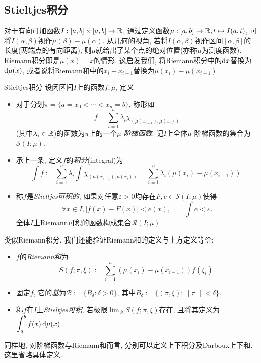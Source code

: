 \subsection{Stieltjes积分}

对于有向可加函数$I:[a,b] \times [a,b] \to \mathbb{R}$, 通过定义函数$\mu :[a,b] \to \mathbb{R} ,t \mapsto I(a,t)$, 可将$I(\alpha ,\beta)$视作$\mu (\beta)-\mu (\alpha)$. 从几何的视角, 若将$I(\alpha ,\beta)$视作区间$[\alpha ,\beta ]$的长度(两端点的有向距离), 则$\mu$就给出了某个点的绝对位置(亦称$\mu$为测度函数). Riemann积分即是$\mu (x)=x$的情形. 这启发我们, 将Riemann积分中的$\mathop{}\!\mathrm{d} x$替换为$\mathop{}\!\mathrm{d} \mu (x)$, 或者说将Riemann和中的$x_i-x_{i-1}$替换为$\mu (x_i)- \mu (x_{i-1})$. 

\begin{definition}{Stieltjes积分}
	设闭区间$I$上的函数$f,\mu$, 定义
	\begin{itemize}
		\item 对于分划$\pi = \{ a=x_0<\cdots <x_n=b \}$, 称形如$$f = \sum_{i=1}^{n} \lambda _i \chi _{(\mu (x_{i-1}),\mu (x_{i}))} $$
		(其中$\lambda _i \in \mathbb{R}$)的函数为$\pi$上的一个\textit{$\mu$-阶梯函数}. 记$I$上全体$\mu$-阶梯函数的集合为$\mathcal{S}(I;\mu )$. 
		\item 承上一条, 定义$f$的\textit{积分}(integral)为$$\int f := \sum_{i=1}^{n} \lambda _i \int \chi _{(\mu (x_{i-1}), \mu (x_i))} = \sum_{i=1}^{n} \lambda _i (\mu (x_i)-\mu (x_{i-1})). $$
		\item 称$f$是\textit{Stieltjes可积的}, 如果对任意$\varepsilon >0$均存在$F,e \in \mathcal{S}(I;\mu )$使得$$\forall x \in I,|f(x)-F(x)|<e(x),\qquad \int e < \varepsilon .$$
	全体$I$上Riemann可积的函数构成集合$\mathcal{R}(I;\mu)$. 
	\end{itemize}
	类似Riemann积分, 我们还能验证Riemann和的定义与上方定义等价: 
	\begin{itemize}
		\item $f$的\textit{Riemann和}为$$S(f;\pi ,\xi) := \sum_{i=1}^{n} (\mu(x_i)-\mu(x_{i-1}))f(\xi _i) .$$
		\item 固定$f$, 它的\textit{基}为$\mathcal{B} := \{ B_{\delta}:\delta >0 \}$, 其中$B_{\delta} := \{ (\pi ,\xi) : \| \pi \|< \delta \}$. 
		\item 称$f$在$I$上\textit{Stieltjes可积}, 若极限$\displaystyle \lim_{\mathcal{B}} S(f;\pi ,\xi)$存在, 且将其定义为$\displaystyle \int_a^b f(x) \mathop{}\!\mathrm{d} \mu (x)$. 
	\end{itemize}
\end{definition}

同样地, 对阶梯函数与Riemann和而言, 分别可以定义上下积分及Darboux上下和. 这里省略具体定义. 

